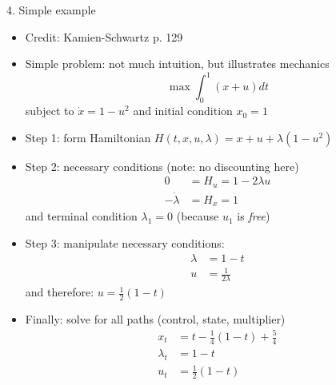 \documentclass[10pt]{beamer}
\begin{document}
\begin{frame}{4. Simple example}
\begin{itemize}
	
\item Credit: Kamien-Schwartz p. 129

\item Simple problem: not much intuition, but illustrates mechanics
\begin{equation*}
	\max \int_0^1 (x + u) dt 
\end{equation*}
subject to $\dot x = 1 - u^2$ and initial condition $x_0 = 1$

\item Step 1: form Hamiltonian $H(t, x, u, \lambda) = x + u + \lambda (1 - u^2)$

\item Step 2: necessary conditions (note: no discounting here)
\begin{align*}
	0 &= H_u = 1 - 2 \lambda u \\
	- \dot \lambda &= H_x = 1
\end{align*}
and terminal condition $\lambda_1 = 0$ (because $u_1$ is \textit{free})

\end{itemize}
\end{frame}



\begin{frame}{}
\begin{itemize}

\item Step 3: manipulate necessary conditions:
\begin{align*}
	\lambda &= 1 - t \\
	u &= \frac{1}{2 \lambda}
\end{align*}
and therefore: $u = \frac{1}{2} (1 - t)$

\item Finally: solve for all paths (control, state, multiplier)
\begin{align*}
	x_t &= t - \frac{1}{4} (1 - t) + \frac{5}{4} \\
	\lambda_t &= 1 - t \\
	u_t &= \frac{1}{2} (1 - t)
\end{align*}

\end{itemize}
\end{frame}







\appendix
\end{document}
